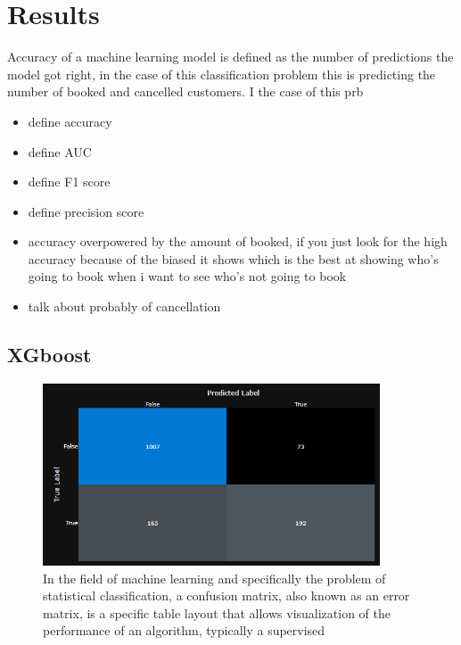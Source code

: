 \chapter{Results}
\label{ch:results}

Accuracy of a machine learning model is defined as the number of predictions the model got right, in the case of this classification problem this is predicting the number of booked and cancelled customers. I the case of this prb





\begin{itemize}
\item define accuracy
\item define AUC
\item define F1 score
\item define precision score
\item accuracy overpowered by the amount of booked, if you just look for the high accuracy because of the biased it shows which is the best at showing who's going to book when i want to see who's not going to book
\item talk about probably of cancellation
\end{itemize}


\section{XGboost}



\begin{figure}[hbt!]
 \includegraphics[width=10cm]{figures/azure_ml_confusion_matrix_xg.png}
 \caption{In the field of machine learning and specifically the problem of statistical classification, a confusion matrix, also known as an error matrix, is a specific table layout that allows visualization of the performance of an algorithm, typically a supervised}
\end{figure}

